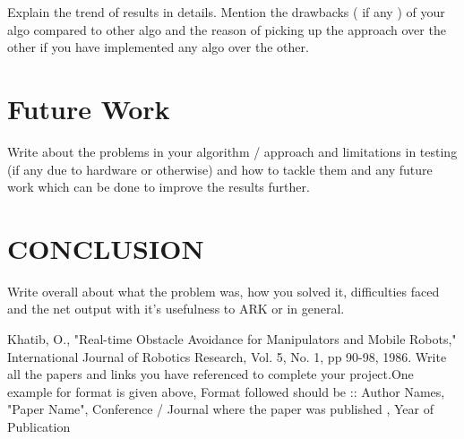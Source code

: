 \documentclass[letterpaper, 10 pt, conference]{IEEEtran}
\begin{document}
Explain the trend of results in details. Mention the drawbacks ( if any ) of your algo compared to other algo and the reason of picking up the approach over the other if you have implemented any algo over the other. 



\section{Future Work}

Write about the problems in your algorithm / approach and limitations in testing (if any due to hardware or otherwise) and how to tackle them and any future work which can be done to improve the results further.

\section*{CONCLUSION}

Write overall about what the problem was, how you solved it, difficulties faced and the net output with it's usefulness to ARK or in general.

\begin{thebibliography}{99} 
Khatib, 
O., "Real-time Obstacle   Avoidance 
for Manipulators   and Mobile    Robots," International Journal of 
Robotics Research, Vol. 5, No. 1, pp 90-98, 1986. 
 Write all the papers and links you have referenced to complete your project.One example for format is given above, Format followed should be :: 
 Author Names, "Paper Name", Conference / Journal where the paper was published , Year of Publication
\end{thebibliography}
\end{document}
